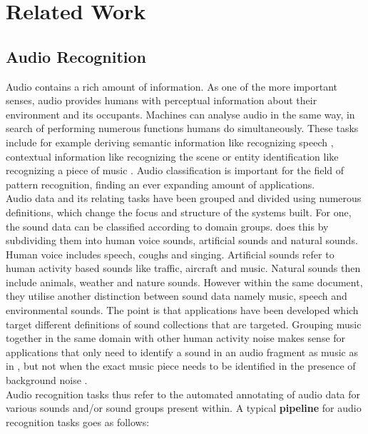 \chapter{Related Work}

\section{Audio Recognition}

Audio contains a rich amount of information. As one of the more important senses, audio provides humans with perceptual information about their environment and its occupants. Machines can analyse audio in the same way, in search of performing numerous functions humans do simultaneously. These tasks include for example deriving semantic information like recognizing speech \citep{hannun2014deep}, contextual information like recognizing the scene \citep{abesser2020review} or entity identification like recognizing a piece of music \citep{huang2019state}. Audio classification is important for the field of pattern recognition, finding an ever expanding amount of applications. \\

Audio data and its relating tasks have been grouped and divided using numerous definitions, which change the focus and structure of the systems built. For one, the sound data can be classified according to domain groups. \cite{duan2014survey} does this by subdividing them into human voice sounds, artificial sounds and natural sounds. Human voice includes speech, coughs and singing. Artificial sounds refer to human activity based sounds like traffic, aircraft and music. Natural sounds then include animals, weather and nature sounds. However within the same document, they utilise another distinction between sound data namely music, speech and environmental sounds. The point is that applications have been developed which target different definitions of sound collections that are targeted. Grouping music together in the same domain with other human activity noise makes sense for applications that only need to identify a sound in an audio fragment as music as in \cite{park2020augmenting}, but not when the exact music piece needs to be identified in the presence of background noise \citep{huang2019state}.\\

Audio recognition tasks thus refer to the automated annotating of audio data for various sounds and/or sound groups present within. A typical \textbf{pipeline} for audio recognition tasks goes as follows: \\

